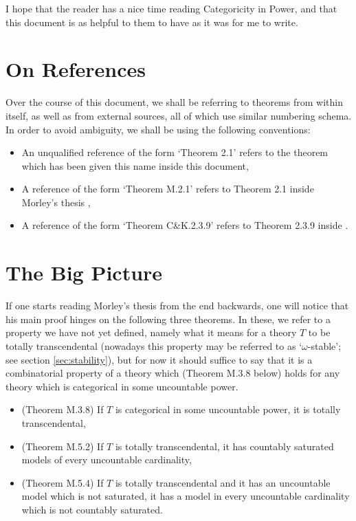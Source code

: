 \documentclass{article}
\theoremstyle{nonumberplain}
\begin{document}
I hope that the reader has a nice time reading Categoricity in Power, and that this document is as helpful to them to have as it was for me to write.

\section{On References}

Over the course of this document, we shall be referring to theorems from within itself, as well as from external sources, all of which use similar numbering schema. In order to avoid ambiguity, we shall be using the following conventions:
\begin{itemize}
\item An unqualified reference of the form `Theorem 2.1' refers to the theorem which has been given this name inside this document,
\item A reference of the form `Theorem M.2.1' refers to Theorem 2.1 inside Morley's thesis \cite{morley},
\item A reference of the form `Theorem C\&K.2.3.9' refers to Theorem 2.3.9 inside \cite{cnk}.
\end{itemize}

\section{The Big Picture}\label{sec:bigpicture}

If one starts reading Morley's thesis from the end backwards, one will notice that his main proof hinges on the following three theorems. In these, we refer to a property we have not yet defined, namely what it means for a theory $T$ to be totally transcendental (nowadays this property may be referred to as `$\omega$-stable'; see section \ref{sec:stability}), but for now it should suffice to say that it is a combinatorial property of a theory which (Theorem M.3.8 below) holds for any theory which is categorical in some uncountable power.

\begin{itemize}
\item (Theorem M.3.8) If $T$ is categorical in some uncountable power, it is totally transcendental,
\item (Theorem M.5.2) If $T$ is totally transcendental, it has countably saturated models of every uncountable cardinality,
\item (Theorem M.5.4) If $T$ is totally transcendental and it has an uncountable model which is not saturated, it has a model in every uncountable cardinality which is not countably saturated.
\end{itemize}
\end{document}
